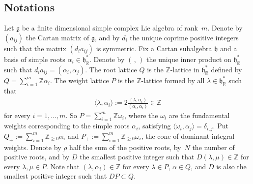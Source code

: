 \documentclass[pdftex]{sigma}%
\numberwithin{equation}{section}
\numberwithin{figure}{section}
\newcommand{\mr}{\mathbb{R}}
\newcommand{\mz}{\mathbb{Z}}
\begin{document}
\subsection{Notations}
Let ${\mathfrak g}$ be a finite dimensional simple complex Lie algebra of rank~$m$. Denote by $(a_{ij})$ the Cartan matrix of ${\mathfrak g}$, and by $d_i$ the unique coprime positive integers such that the matrix $(d_ia_{ij})$ is symmetric. Fix a Cartan subalgebra $\mathfrak{h}$ and a basis of simple roots $\alpha_i \in \mathfrak{h}_{\mr}^{*}$. Denote by $(\,,\,)$ the unique inner product on $\mathfrak{h}_{\mr}^{*}$ such that $d_ia_{ij} = (\alpha_i,\alpha_j)$. The root lattice $Q$ is the $\mz$-lattice in $\mathfrak{h}_{\mr}^{*}$ defined by $\textstyle Q = \sum_{i=1}^m \mathbb{Z} \alpha_i$. The weight lattice $P$ is the $\mz$-lattice formed by all $\lambda\in \mathfrak{h}_{\mr}^{*}$ such that
\begin{gather*}
\langle \lambda,\alpha_i\rangle := 2\frac{(\lambda,\alpha_i)}{(\alpha_i,\alpha_i)}\in \mz
\end{gather*}
for every $i=1,\dots,m$. So $P= \sum_{i=1}^m \mathbb{Z} \omega_i$, where the $\omega_i$ are the fundamental weights corresponding to the simple roots $\alpha_i$, satisfying $\langle \omega_i,\alpha_j\rangle = \delta_{i,j}$. Put $Q_+ := \sum_{i=1}^m \mathbb{Z}_{\geq 0} \alpha_i$ and $P_+:= \sum_{i=1}^m \mathbb{Z}_{\geq 0} \omega_i$, the cone of dominant integral weights. Denote by $\rho$ half the sum of the positive roots, by~$N$ the number of positive roots, and by $D$ the smallest positive integer such that $D(\lambda,\mu)\in {\mathbb Z}$ for every $\lambda,\mu\in P$. Note that $(\lambda,\alpha_i)\in \mz$ for every $\lambda\in P$, $\alpha\in Q$, and $D$ is also the smallest positive integer such that $DP\subset Q$.
\end{document}
